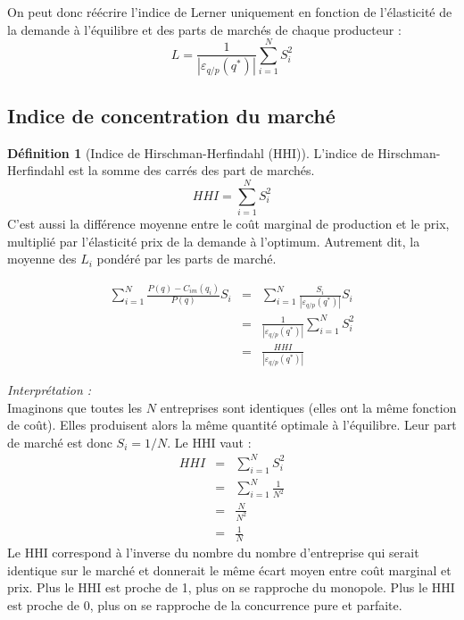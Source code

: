 \documentclass[
]{book}
\theoremstyle{definition}
\newtheorem{definition}{Définition}[chapter]
\theoremstyle{definition}
\theoremstyle{definition}
\theoremstyle{definition}
\theoremstyle{remark}
\begin{document}
On peut donc réécrire l'indice de Lerner uniquement en fonction de l'élasticité de la demande à l'équilibre et des parts de marchés de chaque producteur :
\[
L=\frac{1}{\left|\varepsilon_{q/p}(q^*)\right|}\sum_{i=1}^NS_i^2
\]

\hypertarget{indice-de-concentration-du-marchuxe9}{%
\subsection{Indice de concentration du marché}\label{indice-de-concentration-du-marchuxe9}}

\begin{definition}[Indice de Hirschman-Herfindahl (HHI)]
\protect\hypertarget{def:HHI}{}\label{def:HHI}L'indice de Hirschman-Herfindahl est la somme des carrés des part de marchés.
\[HHI = \sum_{i=1}^NS_i^2\]
C'est aussi la différence moyenne entre le coût marginal de production et le prix, multiplié par l'élasticité prix de la demande à l'optimum.
Autrement dit, la moyenne des \(L_i\) pondéré par les parts de marché.
\end{definition}

\[
 \begin{array}{rcl}
 \sum_{i=1}^{N}\frac{P(q) -C_{im}(q_i)}{P(q)}S_i &=&\sum_{i=1}^{N} \frac{S_i}{\left|\varepsilon_{q/p}(q^*)\right|}S_i \\
 &=&\frac{1}{\left|\varepsilon_{q/p}(q^*)\right|}\sum_{i=1}^NS_i^2\\
 &=&\frac{HHI}{\left|\varepsilon_{q/p}(q^*)\right|}
 \end{array}
 \]

\emph{Interprétation :}\\
Imaginons que toutes les \(N\) entreprises sont identiques (elles ont la même fonction de coût).
Elles produisent alors la même quantité optimale à l'équilibre.
Leur part de marché est donc \(S_i=1/N\).
Le HHI vaut :
\[
\begin{array}{rcl}
HHI&=&\sum_{i=1}^NS_i^2\\
&=&\sum_{i=1}^N\frac{1}{N^2}\\
&=&\frac{N}{N^2} \\
&=&\frac{1}{N}
\end{array}
\]
Le HHI correspond à l'inverse du nombre du nombre d'entreprise qui serait identique sur le marché et donnerait le même écart moyen entre coût marginal et prix.
Plus le HHI est proche de 1, plus on se rapproche du monopole.
Plus le HHI est proche de 0, plus on se rapproche de la concurrence pure et parfaite.
\end{document}
